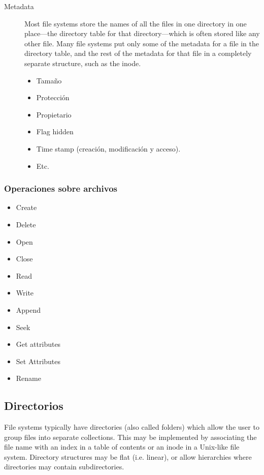 \documentclass[a4paper, twoside]{article}
\begin{document}
\begin{description}
	\item[Metadata] Most file systems store the names of all the files in one directory in one place—the directory table for that directory—which is often stored like any other file. Many file systems put only some of the metadata for a file in the directory table, and the rest of the metadata for that file in a completely separate structure, such as the inode.
	\begin{itemize}
		\item Tamaño
		\item Protección
		\item Propietario
		\item Flag hidden
		\item Time stamp (creación, modificación y acceso).
		\item Etc.
	\end{itemize}
\end{description}

\subsubsection{Operaciones sobre archivos}
\begin{itemize}
	\item Create
	\item Delete
	\item Open
	\item Close
	\item Read
	\item Write
	\item Append
	\item Seek
	\item Get attributes
	\item Set Attributes
	\item Rename
\end{itemize}

\subsection{Directorios}
File systems typically have directories (also called folders) which allow the user to group files into separate collections. This may be implemented by associating the file name with an index in a table of contents or an inode in a Unix-like file system. Directory structures may be flat (i.e. linear), or allow hierarchies where directories may contain subdirectories.
\end{document}
